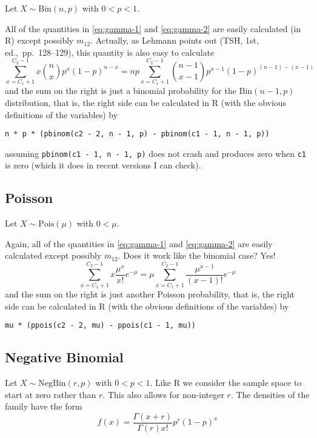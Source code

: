 \documentclass{article}
\newcommand{\BinomialDis}{\text{Bin}}
\newcommand{\NegativeBinomialDis}{\text{NegBin}}
\newcommand{\PoissonDis}{\text{Pois}}
\begin{document}
Let $X \sim \BinomialDis(n, p)$ with $0 < p < 1$.

All of the quantities in \eqref{eq:gamma-1} and \eqref{eq:gamma-2}
are easily calculated (in R) except possibly $m_{1 2}$.  Actually,
as Lehmann points out (TSH, 1st, ed.,\ pp.~128--129), this quantity
is also easy to calculate
$$
   \sum_{x = C_1 + 1}^{C_2 - 1} x \binom{n}{x} p^x (1 - p)^{n - x}
   =
   n p \sum_{x = C_1 + 1}^{C_2 - 1} \binom{n - 1}{x - 1}
   p^{x - 1} (1 - p)^{(n - 1) - (x - 1)}
$$
and the sum on the right is just a binomial probability for the
$\BinomialDis(n - 1, p)$ distribution, that is, the right side can be calculated
in R (with the obvious definitions of the variables) by
\begin{verbatim}
n * p * (pbinom(c2 - 2, n - 1, p) - pbinom(c1 - 1, n - 1, p))
\end{verbatim}
assuming \texttt{pbinom(c1 - 1, n - 1, p)} does not crash and
produces zero when \texttt{c1} is zero (which it
does in recent versions I can check).

\subsection{Poisson}

Let $X \sim \PoissonDis(\mu)$ with $0 < \mu$.

Again, all of the quantities in \eqref{eq:gamma-1} and \eqref{eq:gamma-2}
are easily calculated except possibly $m_{1 2}$.  Does it work like the
binomial case?  Yes!
$$
   \sum_{x = C_1 + 1}^{C_2 - 1} x \frac{\mu^x}{x !} e^{- \mu}
   =
   \mu \sum_{x = C_1 + 1}^{C_2 - 1} \frac{\mu^{x - 1}}{(x - 1)!} e^{- \mu}
$$
and the sum on the right is just another Poisson probability,
that is, the right side can be calculated
in R (with the obvious definitions of the variables) by
\begin{verbatim}
mu * (ppois(c2 - 2, mu) - ppois(c1 - 1, mu))
\end{verbatim}

\subsection{Negative Binomial} \label{sec:negbin}

Let $X \sim \NegativeBinomialDis(r, p)$ with $0 < p < 1$.  Like R we consider
the sample space to start at zero rather than $r$.  This also allows for
non-integer $r$.  The densities of the family have the form
$$
   f(x) = \frac{\Gamma(x+r)}{\Gamma(r) x!} p^r (1-p)^x
$$
\end{document}

